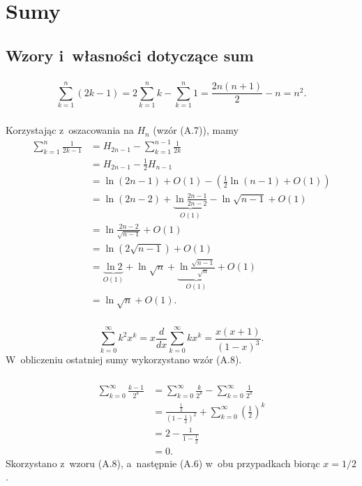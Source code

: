 \chapter{Sumy}

\section{Wzory i~własności dotyczące sum}

\subsection{} %
\[
	\sum_{k=1}^n(2k-1) = 2\sum_{k=1}^nk-\sum_{k=1}^n1 = \frac{2n(n+1)}{2}-n = n^2.
\]

\subsection{} %
Korzystając z~oszacowania na $H_n$ (wzór (A.7)), mamy
\begin{align*}
	\sum_{k=1}^n\frac{1}{2k-1} &= H_{2n-1}-\sum_{k=1}^{n-1}\frac{1}{2k} \\
	&= H_{2n-1}-\frac{1}{2}H_{n-1} \\
	&= \ln (2n-1)+O(1)-\left(\frac{1}{2}\ln(n-1)+O(1)\right) \\
	&= \ln (2n-2)+\underbrace{\ln\frac{2n-1}{2n-2}}_{O(1)}-\ln\sqrt{n-1}+O(1) \\
	&= \ln\frac{2n-2}{\sqrt{n-1}}+O(1) \\
	&= \ln\left(2\sqrt{n-1}\right)+O(1) \\
	&= \underbrace{\ln 2}_{O(1)}+\ln\sqrt{n}+\underbrace{\ln\frac{\sqrt{n-1}}{\sqrt{n}}}_{O(1)}+O(1) \\
	&= \ln\sqrt{n}+O(1).
\end{align*}

\subsection{} %
\[
	\sum_{k=0}^\infty k^2x^k = x\frac{d}{dx}\sum_{k=0}^\infty kx^k = \frac{x(x+1)}{(1-x)^3}.
\]
W~obliczeniu ostatniej sumy wykorzystano wzór (A.8).

\subsection{} %
\begin{align*}
	\sum_{k=0}^\infty\frac{k-1}{2^k} &= \sum_{k=0}^\infty\frac{k}{2^k}-\sum_{k=0}^\infty\frac{1}{2^k} \\
	&= \frac{\frac{1}{2}}{\left(1-\frac{1}{2}\right)^2}+\sum_{k=0}^\infty\left(\frac{1}{2}\right)^k \\
	&= 2-\frac{1}{1-\frac{1}{2}} \\
	&= 0.
\end{align*}
Skorzystano z~wzoru (A.8), a~następnie (A.6) w~obu przypadkach biorąc $x=1/2$.

